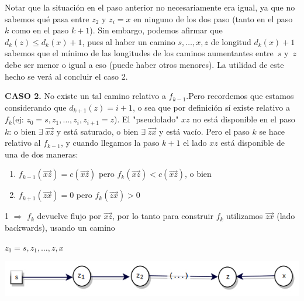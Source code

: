 \documentclass[10pt,a4paper]{article}
\begin{document}
Notar que la situación en el paso anterior no necesariamente era igual, ya que no sabemos qué pasa entre $z_2$ y $z_i = x$ en ninguno de los dos paso (tanto en el paso $k$ como en el paso $k+1$). Sin embargo, podemos afirmar que $d_k(z) \leq d_k(x)+1$, pues al haber un camino $s, \dots,x,z $ de longitud $d_k(x)+1$ sabemos que el mínimo de las longitudes de los caminos aumentantes entre $s$ y $z$ debe ser menor o igual a eso (puede haber otros menores). La utilidad de este hecho se verá al concluir el caso 2.

\textbf{CASO 2.} No existe un tal camino relativo a $f_{k-1}$.Pero recordemos que estamos considerando que $d_{k+1}(z)=i+1$, o sea que por definición sí existe relativo a $f_k$(ej: $z_0=s,z_1,\dots,z_i,z_{i+1} = z$). El "pseudolado" $xz$ no está disponible en el paso $k$: o bien $\exists\;\overrightarrow{xz}$ y está saturado, o bien $\exists\;\overrightarrow{zx}$ y está vacío. Pero el paso $k$ se hace relativo al $f_{k-1}$, y cuando llegamos la paso $k+1$ el lado $xz$ está disponible de una de dos maneras:

\begin{enumerate}

	\item $f_{k-1}(\overrightarrow{xz}) =c(\overrightarrow{xz})$ pero $f_k(\overrightarrow{xz}) < c (\overrightarrow{xz})$, o bien
	\item $f_{k+1}(\overrightarrow{zx}) = 0$ pero $f_k(\overrightarrow{zx}) > 0$
\end{enumerate}

1 $\Rightarrow$ $f_k$ devuelve flujo por $\overrightarrow{xz}$, por lo tanto para construir $f_k$ utilizamos $\overrightarrow{zx}$ (lado backwards), usando un camino

\begin{center}
$z_0=s, z_1, \dots, z,x$
\end{center}

\begin{center}

    \begin{adjustbox}{max size={\textwidth}{\textheight}}
        \includegraphics{definitions/prueba_EK4.jpg}
        \end{adjustbox}
    
\end{center}
\end{document}
